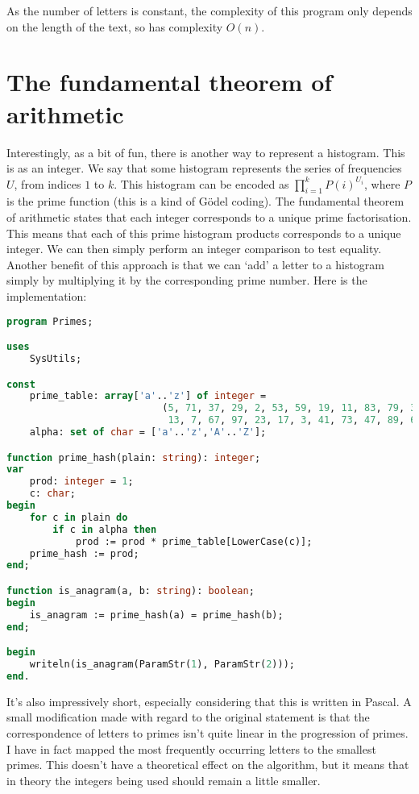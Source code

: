 \documentclass{article}
\begin{document}
    As the number of letters is constant, the complexity of this program only
    depends on the length of the text, so has complexity $O(n)$.

    \section{The fundamental theorem of arithmetic}

    Interestingly, as a bit of fun, there is another way to represent a
    histogram. This is as an integer. We say that some histogram represents the
    series of frequencies $U$, from indices $1$ to $k$.  This histogram can be
    encoded as
    $\prod\limits_{i=1}^{k} P(i)^{U_i}$,
    where $P$ is the prime function (this is a kind of G\"odel coding). The
    fundamental theorem of arithmetic states that each integer corresponds to a
    unique prime factorisation. This means that each of this prime histogram
    products corresponds to a unique integer. We can then simply perform an
    integer comparison to test equality.  Another benefit of this approach is
    that we can `add' a letter to a histogram simply by multiplying it by the
    corresponding prime number. Here is the implementation:

\begin{lstlisting}[language=Pascal, caption=Prime-number anagram checking in Pascal]
program Primes;

uses
    SysUtils;

const
    prime_table: array['a'..'z'] of integer =
                           (5, 71, 37, 29, 2, 53, 59, 19, 11, 83, 79, 31, 43,
                            13, 7, 67, 97, 23, 17, 3, 41, 73, 47, 89, 61, 101);
    alpha: set of char = ['a'..'z','A'..'Z'];

function prime_hash(plain: string): integer;
var
    prod: integer = 1;
    c: char;
begin
    for c in plain do
        if c in alpha then
            prod := prod * prime_table[LowerCase(c)];
    prime_hash := prod;
end;

function is_anagram(a, b: string): boolean;
begin
    is_anagram := prime_hash(a) = prime_hash(b);
end;

begin
    writeln(is_anagram(ParamStr(1), ParamStr(2)));
end.
\end{lstlisting}

    It's also impressively short, especially considering that this is written
    in Pascal. A small modification made with regard to the original statement
    is that the correspondence of letters to primes isn't quite linear in the
    progression of primes. I have in fact mapped the most frequently occurring
    letters to the smallest primes. This doesn't have a theoretical effect on
    the algorithm, but it means that in theory the integers being used should
    remain a little smaller.
\end{document}
